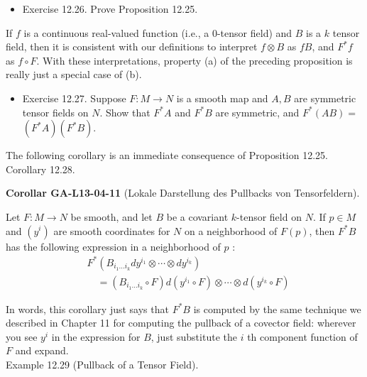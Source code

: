 \documentclass[10pt, letterpaper]{article}
\newcommand{\CustomHeading}[3]{%
  \par\medskip\noindent%
  \textbf{#1 #2} \textnormal{(#3)}.\enskip%
}
\newenvironment{KORO}[2]{\begin{unitbox}\CustomHeading{Corollar}{#1}{#2}}{\end{unitbox}}
\begin{document}
\begin{itemize}
  \item Exercise 12.26. Prove Proposition 12.25.
\end{itemize}

If $f$ is a continuous real-valued function (i.e., a 0-tensor field) and $B$ is a $k$ tensor field, then it is consistent with our definitions to interpret $f \otimes B$ as $f B$, and $F^{*} f$ as $f \circ F$. With these interpretations, property (a) of the preceding proposition is really just a special case of (b).



\begin{itemize}
  \item Exercise 12.27. Suppose $F: M \rightarrow N$ is a smooth map and $A, B$ are symmetric tensor fields on $N$. Show that $F^{*} A$ and $F^{*} B$ are symmetric, and $F^{*}(A B)=$ $\left(F^{*} A\right)\left(F^{*} B\right)$.
\end{itemize}

The following corollary is an immediate consequence of Proposition 12.25.\\


Corollary 12.28. 

\begin{KORO}{GA-L13-04-11}{Lokale Darstellung des Pullbacks von Tensorfeldern}
Let $F: M \rightarrow N$ be smooth, and let $B$ be a covariant $k$-tensor field on $N$. If $p \in M$ and $\left(y^{i}\right)$ are smooth coordinates for $N$ on a neighborhood of $F(p)$, then $F^{*} B$ has the following expression in a neighborhood of $p$ :
$$
\begin{aligned}
& F^{*}\left(B_{i_{1} \ldots i_{k}} d y^{i_{1}} \otimes \cdots \otimes d y^{i_{k}}\right) \\
& \quad=\left(B_{i_{1} \ldots i_{k}} \circ F\right) d\left(y^{i_{1}} \circ F\right) \otimes \cdots \otimes d\left(y^{i_{k}} \circ F\right)
\end{aligned}
$$
\end{KORO}

In words, this corollary just says that $F^{*} B$ is computed by the same technique we described in Chapter 11 for computing the pullback of a covector field: wherever\\
you see $y^{i}$ in the expression for $B$, just substitute the $i$ th component function of $F$ and expand.\\



Example 12.29 (Pullback of a Tensor Field). 
\end{document}
